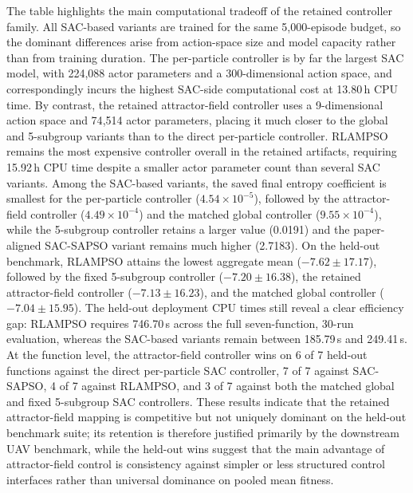 \documentclass[final,5p,times]{elsarticle}
\begin{document}
The table highlights the main computational tradeoff of the retained controller family.
All SAC-based variants are trained for the same 5{,}000-episode budget, so the dominant differences arise from action-space size and model capacity rather than from training duration.
The per-particle controller is by far the largest SAC model, with 224{,}088 actor parameters and a 300-dimensional action space, and correspondingly incurs the highest SAC-side computational cost at 13.80\,h CPU time.
By contrast, the retained attractor-field controller uses a 9-dimensional action space and 74{,}514 actor parameters, placing it much closer to the global and 5-subgroup variants than to the direct per-particle controller.
RLAMPSO remains the most expensive controller overall in the retained artifacts, requiring 15.92\,h CPU time despite a smaller actor parameter count than several SAC variants.
Among the SAC-based variants, the saved final entropy coefficient is smallest for the per-particle controller ($4.54\times 10^{-5}$), followed by the attractor-field controller ($4.49\times 10^{-4}$) and the matched global controller ($9.55\times 10^{-4}$), while the 5-subgroup controller retains a larger value (0.0191) and the paper-aligned SAC-SAPSO variant remains much higher (2.7183).
On the held-out benchmark, RLAMPSO attains the lowest aggregate mean ($-7.62 \pm 17.17$), followed by the fixed 5-subgroup controller ($-7.20 \pm 16.38$), the retained attractor-field controller ($-7.13 \pm 16.23$), and the matched global controller ($-7.04 \pm 15.95$).
The held-out deployment CPU times still reveal a clear efficiency gap: RLAMPSO requires 746.70\,s across the full seven-function, 30-run evaluation, whereas the SAC-based variants remain between 185.79\,s and 249.41\,s.
At the function level, the attractor-field controller wins on 6 of 7 held-out functions against the direct per-particle SAC controller, 7 of 7 against SAC-SAPSO, 4 of 7 against RLAMPSO, and 3 of 7 against both the matched global and fixed 5-subgroup SAC controllers.
These results indicate that the retained attractor-field mapping is competitive but not uniquely dominant on the held-out benchmark suite; its retention is therefore justified primarily by the downstream UAV benchmark, while the held-out wins suggest that the main advantage of attractor-field control is consistency against simpler or less structured control interfaces rather than universal dominance on pooled mean fitness.
\end{document}
